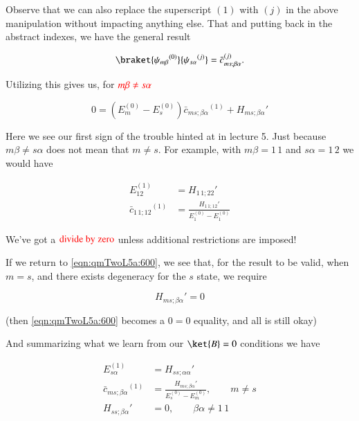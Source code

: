 Observe that we can also replace the superscript $(1)$ with $(j)$ in the above manipulation without impacting anything else.  That and putting back in the abstract indexes, we have the general result

\begin{equation}\label{eqn:qmTwoL5a:580}
\braket{{\psi_{m \beta}}^{(0)}}{{\psi_{s \alpha}}^{(j)}} 
=
{\bar{c}_{ms ; \beta \alpha}}^{(j)}.
\end{equation}

Utilizing this gives us, for $\color{red}{m \beta \ne s \alpha}$

\begin{equation}\label{eqn:qmTwoL5a:600}
0 = 
( E_m^{(0)} - E_s^{(0)}) 
{\bar{c}_{ms ; \beta \alpha}}^{(1)}
+
{H_{ms ; \beta \alpha}}' 
\end{equation}

Here we see our first sign of the trouble hinted at in lecture 5.  Just because $m \beta \ne s \alpha$ does not mean that $m \ne s$.  For example, with $m \beta = 1\,1$ and $s\alpha = 1\,2$ we would have

\begin{align}\label{eqn:qmTwoL5a:620a}
E_{1 2}^{(1)} &= {H_{1\,1 ; 2 2}}' \\
{\bar{c}_{1\,1 ; 1 2}}^{(1)}
&=
\frac{{H_{1\,1 ; 1 2}}' }
{ E_1^{(0)} - E_1^{(0)} }
\end{align}

We've got a $\color{red}{\text{divide by zero}}$ unless additional restrictions are imposed!

If we return to \ref{eqn:qmTwoL5a:600}, we see that, for the result to be valid, when $m = s$, and there exists degeneracy for the $s$ state, we require

\begin{equation}\label{eqn:qmTwoL5a:610}
{H_{ms ; \beta \alpha}}' = 0
\end{equation}

(then \ref{eqn:qmTwoL5a:600} becomes a $0 = 0$ equality, and all is still okay)

And summarizing what we learn from our $\ket{B} = 0$ conditions we have

\begin{align}\label{eqn:qmTwoL5a:620}
E_{s \alpha}^{(1)} &= {H_{ss ; \alpha \alpha}}' \\
{\bar{c}_{ms ; \beta \alpha}}^{(1)}
&=
\frac{{H_{ms ; \beta \alpha}}' }
{ E_s^{(0)} - E_m^{(0)} }, \qquad {m \ne s} \\
{H_{ss ; \beta \alpha}}' &= 0, \qquad \beta \alpha \ne 1\,1
\end{align}

